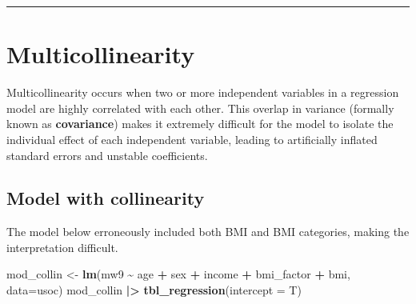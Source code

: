 \documentclass[
]{book}
\newenvironment{Shaded}{\begin{snugshade}}{\end{snugshade}}
\newcommand{\AttributeTok}[1]{\textcolor[rgb]{0.13,0.29,0.53}{#1}}
\newcommand{\FunctionTok}[1]{\textcolor[rgb]{0.13,0.29,0.53}{\textbf{#1}}}
\newcommand{\NormalTok}[1]{#1}
\newcommand{\OtherTok}[1]{\textcolor[rgb]{0.56,0.35,0.01}{#1}}
\newcommand{\SpecialCharTok}[1]{\textcolor[rgb]{0.81,0.36,0.00}{\textbf{#1}}}
\begin{document}
\begin{center}\rule{0.5\linewidth}{0.5pt}\end{center}

\section{Multicollinearity}\label{multicollinearity}

Multicollinearity occurs when two or more independent variables in a regression model are highly correlated with each other. This overlap in variance (formally known as \textbf{covariance}) makes it extremely difficult for the model to isolate the individual effect of each independent variable, leading to artificially inflated standard errors and unstable coefficients.

\subsection{Model with collinearity}\label{model-with-collinearity}

The model below erroneously included both BMI and BMI categories, making the interpretation difficult.

\begin{Shaded}
\begin{Highlighting}[]
\NormalTok{mod\_collin }\OtherTok{\textless{}{-}} \FunctionTok{lm}\NormalTok{(mw9 }\SpecialCharTok{\textasciitilde{}}\NormalTok{ age }\SpecialCharTok{+}\NormalTok{ sex }\SpecialCharTok{+}\NormalTok{ income }\SpecialCharTok{+}\NormalTok{ bmi\_factor }\SpecialCharTok{+}\NormalTok{ bmi, }\AttributeTok{data=}\NormalTok{usoc)}
\NormalTok{mod\_collin }\SpecialCharTok{|\textgreater{}} \FunctionTok{tbl\_regression}\NormalTok{(}\AttributeTok{intercept =}\NormalTok{ T)}
\end{Highlighting}
\end{Shaded}
\end{document}
